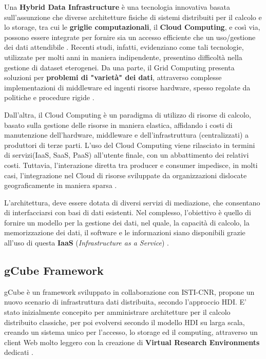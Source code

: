 \documentclass[11pt]{article}
\begin{document}
Una \textbf{Hybrid Data Infrastructure} è una tecnologia innovativa basata sull'assunzione che diverse architetture fisiche di sistemi distribuiti per il calcolo e lo storage, tra cui le \textbf{griglie computazionali}, il \textbf{Cloud Computing}, e così via, possono essere integrate per fornire sia un accesso efficiente che un uso/gestione dei dati attendibile \cite{candela2012managing}.
Recenti studi, infatti, evidenziano come tali tecnologie, utilizzate per molti anni in maniera indipendente, presentino difficoltà nella gestione di dataset eterogenei. Da una parte, il Grid Computing presenta soluzioni per \textbf{problemi di "varietà" dei dati}, attraverso complesse implementazioni di middleware ed ingenti risorse hardware, spesso regolate da politiche e procedure rigide \cite{candela2012managing}.

Dall'altra, il Cloud Computing è un paradigma di utilizzo di risorse di calcolo, basato sulla gestione delle risorse in maniera elastica, affidando i costi di manutenzione dell'hardware, middleware e dell'infrastruttura (centralizzati) a produttori di terze parti. L'uso del Cloud Computing viene rilasciato in termini di servizi(IaaS, SaaS, PaaS) all'utente finale, con un abbattimento dei relativi costi. Tuttavia, l'interazione diretta tra producer e consumer impedisce, in molti casi, l'integrazione nel Cloud di risorse sviluppate da organizzazioni dislocate geograficamente in maniera sparsa \cite{candela2012managing}.

L'architettura, deve essere dotata di diversi servizi di mediazione, che consentano di interfacciarsi con basi di dati esistenti. Nel complesso, l'obiettivo è quello di fornire un modello per la gestione dei dati, nel quale, la capacità di calcolo, la memorizzazione dei dati, il software e le informazioni siano disponibili grazie all'uso di questa \textbf{IaaS} (\emph{Infrastructure as a Service}) \cite{candela2012managing}.

\subsection{gCube Framework}

gCube è un framework sviluppato in collaborazione con ISTI-CNR, propone un nuovo scenario di infrastruttura dati distribuita, secondo l'approccio HDI. E' stato inizialmente concepito per amministrare architetture per il calcolo distribuito classiche, per poi evolversi secondo il modello HDI su larga scala, creando un sistema unico per l'accesso, lo storage ed il computing, attraverso un client Web molto leggero con la creazione di \textbf{Virtual Research Environments} dedicati \cite{candela2012managing} \cite{candela2008gcube}. 
\end{document}
